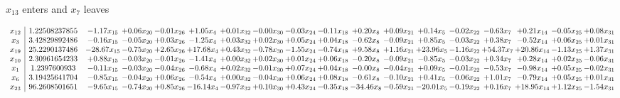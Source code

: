 \documentclass[9pt]{article}
\begin{document}
 $ x_{13} $ enters and $ x_{7} $ leaves 

 \[\begin{array}{c| c c@{\hskip 2pt} c@{\hskip 2pt} c@{\hskip 2pt} c@{\hskip 2pt} c@{\hskip 2pt} c@{\hskip 2pt} c@{\hskip 2pt} c@{\hskip 2pt} c@{\hskip 2pt} c@{\hskip 2pt} c@{\hskip 2pt} c@{\hskip 2pt} c@{\hskip 2pt} c@{\hskip 2pt} c@{\hskip 2pt} c@{\hskip 2pt} }
 x_{12}   &  1.22508237855 & -1.17 x_{15} & +  0.06 x_{20} & -0.01 x_{26} & +  1.05 x_{4} & +  0.01 x_{32} & -0.00 x_{30} & -0.03 x_{24} & -0.11 x_{18} & +  0.20 x_{8} & +  0.09 x_{21} & +  0.14 x_{5} & -0.02 x_{22} & -0.63 x_{7} & +  0.21 x_{14} & -0.05 x_{25} & +  0.08 x_{31}\\
 x_{3}   &  3.42829892486 & -0.16 x_{15} & -0.05 x_{20} & +  0.03 x_{26} & -1.25 x_{4} & +  0.03 x_{32} & +  0.02 x_{30} & +  0.05 x_{24} & +  0.04 x_{18} & -0.62 x_{8} & -0.09 x_{21} & +  0.85 x_{5} & -0.03 x_{22} & +  0.38 x_{7} & -0.52 x_{14} & +  0.06 x_{25} & +  0.01 x_{31}\\
 x_{19}   &  25.2290137486 & -28.67 x_{15} & -0.75 x_{20} & +  2.65 x_{26} & + 17.68 x_{4} & +  0.43 x_{32} & -0.78 x_{30} & -1.55 x_{24} & -0.74 x_{18} & +  9.58 x_{8} & +  1.16 x_{21} & + 23.96 x_{5} & -1.16 x_{22} & + 54.37 x_{7} & + 20.86 x_{14} & -1.13 x_{25} & +  1.37 x_{31}\\
 x_{10}   &  2.30961654233 & +  0.88 x_{15} & -0.03 x_{20} & -0.01 x_{26} & -1.41 x_{4} & +  0.00 x_{32} & +  0.02 x_{30} & +  0.01 x_{24} & +  0.06 x_{18} & -0.20 x_{8} & -0.09 x_{21} & -0.85 x_{5} & -0.03 x_{22} & +  0.34 x_{7} & +  0.28 x_{14} & +  0.02 x_{25} & -0.06 x_{31}\\
 x_{1}   &  1.2397600933 & -0.11 x_{15} & -0.03 x_{20} & -0.04 x_{26} & -0.68 x_{4} & +  0.02 x_{32} & -0.01 x_{30} & +  0.07 x_{24} & +  0.04 x_{18} & -0.00 x_{8} & -0.04 x_{21} & +  0.09 x_{5} & -0.01 x_{22} & -0.53 x_{7} & -0.98 x_{14} & +  0.05 x_{25} & -0.02 x_{31}\\
 x_{6}   &  3.19425641704 & -0.85 x_{15} & -0.04 x_{20} & +  0.06 x_{26} & -0.54 x_{4} & +  0.00 x_{32} & -0.04 x_{30} & +  0.06 x_{24} & +  0.08 x_{18} & -0.61 x_{8} & -0.10 x_{21} & +  0.41 x_{5} & -0.06 x_{22} & +  1.01 x_{7} & -0.79 x_{14} & +  0.05 x_{25} & +  0.01 x_{31}\\
 x_{23}   &  96.2608501651 & -9.65 x_{15} & -0.74 x_{20} & +  0.85 x_{26} & -16.14 x_{4} & -0.97 x_{32} & +  0.10 x_{30} & +  0.43 x_{24} & -0.35 x_{18} & -34.46 x_{8} & -0.59 x_{21} & -20.01 x_{5} & -0.19 x_{22} & +  0.16 x_{7} & + 18.95 x_{14} & +  1.12 x_{25} & -1.54 x_{31}\\

\end{array}\]
\end{document}

